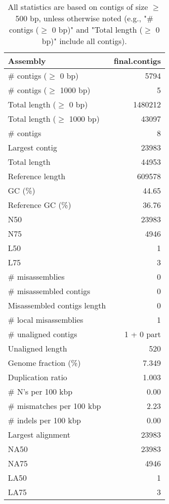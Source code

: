 \documentclass[12pt,a4paper]{article}
\begin{document}
\begin{table}[ht]
\begin{center}
\caption{All statistics are based on contigs of size $\geq$ 500 bp, unless otherwise noted (e.g., "\# contigs ($\geq$ 0 bp)" and "Total length ($\geq$ 0 bp)" include all contigs).}
\begin{tabular}{|l*{1}{|r}|}
\hline
Assembly & final.contigs \\ \hline
\# contigs ($\geq$ 0 bp) & 5794 \\ \hline
\# contigs ($\geq$ 1000 bp) & 5 \\ \hline
Total length ($\geq$ 0 bp) & 1480212 \\ \hline
Total length ($\geq$ 1000 bp) & 43097 \\ \hline
\# contigs & 8 \\ \hline
Largest contig & 23983 \\ \hline
Total length & 44953 \\ \hline
Reference length & 609578 \\ \hline
GC (\%) & 44.65 \\ \hline
Reference GC (\%) & 36.76 \\ \hline
N50 & 23983 \\ \hline
N75 & 4946 \\ \hline
L50 & 1 \\ \hline
L75 & 3 \\ \hline
\# misassemblies & 0 \\ \hline
\# misassembled contigs & 0 \\ \hline
Misassembled contigs length & 0 \\ \hline
\# local misassemblies & 1 \\ \hline
\# unaligned contigs & 1 + 0 part \\ \hline
Unaligned length & 520 \\ \hline
Genome fraction (\%) & 7.349 \\ \hline
Duplication ratio & 1.003 \\ \hline
\# N's per 100 kbp & 0.00 \\ \hline
\# mismatches per 100 kbp & 2.23 \\ \hline
\# indels per 100 kbp & 0.00 \\ \hline
Largest alignment & 23983 \\ \hline
NA50 & 23983 \\ \hline
NA75 & 4946 \\ \hline
LA50 & 1 \\ \hline
LA75 & 3 \\ \hline
\end{tabular}
\end{center}
\end{table}
\end{document}
